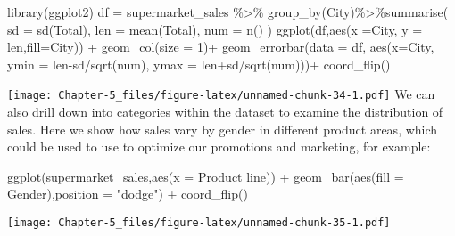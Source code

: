 \documentclass[
]{article}
\newenvironment{Shaded}{\begin{snugshade}}{\end{snugshade}}
\newcommand{\AttributeTok}[1]{\textcolor[rgb]{0.77,0.63,0.00}{#1}}
\newcommand{\DecValTok}[1]{\textcolor[rgb]{0.00,0.00,0.81}{#1}}
\newcommand{\FunctionTok}[1]{\textcolor[rgb]{0.00,0.00,0.00}{#1}}
\newcommand{\NormalTok}[1]{#1}
\newcommand{\OtherTok}[1]{\textcolor[rgb]{0.56,0.35,0.01}{#1}}
\newcommand{\SpecialCharTok}[1]{\textcolor[rgb]{0.00,0.00,0.00}{#1}}
\newcommand{\StringTok}[1]{\textcolor[rgb]{0.31,0.60,0.02}{#1}}
\begin{document}
\begin{Shaded}
\begin{Highlighting}[]
\FunctionTok{library}\NormalTok{(ggplot2)}
\NormalTok{df }\OtherTok{=}\NormalTok{ supermarket\_sales }\SpecialCharTok{\%\textgreater{}\%} \FunctionTok{group\_by}\NormalTok{(City)}\SpecialCharTok{\%\textgreater{}\%}\FunctionTok{summarise}\NormalTok{(}
    \AttributeTok{sd =} \FunctionTok{sd}\NormalTok{(Total),}
    \AttributeTok{len =} \FunctionTok{mean}\NormalTok{(Total),}
    \AttributeTok{num =} \FunctionTok{n}\NormalTok{()}
\NormalTok{  )}
\FunctionTok{ggplot}\NormalTok{(df,}\FunctionTok{aes}\NormalTok{(}\AttributeTok{x =}\NormalTok{City, }\AttributeTok{y =}\NormalTok{ len,}\AttributeTok{fill=}\NormalTok{City)) }\SpecialCharTok{+} 
  \FunctionTok{geom\_col}\NormalTok{(}\AttributeTok{size =} \DecValTok{1}\NormalTok{)}\SpecialCharTok{+} 
  \FunctionTok{geom\_errorbar}\NormalTok{(}\AttributeTok{data =}\NormalTok{ df, }\FunctionTok{aes}\NormalTok{(}\AttributeTok{x=}\NormalTok{City, }\AttributeTok{ymin =}\NormalTok{ len}\SpecialCharTok{{-}}\NormalTok{sd}\SpecialCharTok{/}\FunctionTok{sqrt}\NormalTok{(num),}
                                \AttributeTok{ymax =}\NormalTok{ len}\SpecialCharTok{+}\NormalTok{sd}\SpecialCharTok{/}\FunctionTok{sqrt}\NormalTok{(num)))}\SpecialCharTok{+}
  \FunctionTok{coord\_flip}\NormalTok{()}
\end{Highlighting}
\end{Shaded}

\texttt{[image: Chapter-5\_files/figure-latex/unnamed-chunk-34-1.pdf]} We
can also drill down into categories within the dataset to examine the
distribution of sales. Here we show how sales vary by gender in
different product areas, which could be used to use to optimize our
promotions and marketing, for example:

\begin{Shaded}
\begin{Highlighting}[]
\FunctionTok{ggplot}\NormalTok{(supermarket\_sales,}\FunctionTok{aes}\NormalTok{(}\AttributeTok{x =} \StringTok{\textasciigrave{}}\AttributeTok{Product line}\StringTok{\textasciigrave{}}\NormalTok{)) }\SpecialCharTok{+} 
  \FunctionTok{geom\_bar}\NormalTok{(}\FunctionTok{aes}\NormalTok{(}\AttributeTok{fill =}\NormalTok{ Gender),}\AttributeTok{position =} \StringTok{"dodge"}\NormalTok{) }\SpecialCharTok{+} 
  \FunctionTok{coord\_flip}\NormalTok{()}
\end{Highlighting}
\end{Shaded}

\texttt{[image: Chapter-5\_files/figure-latex/unnamed-chunk-35-1.pdf]}
\end{document}
